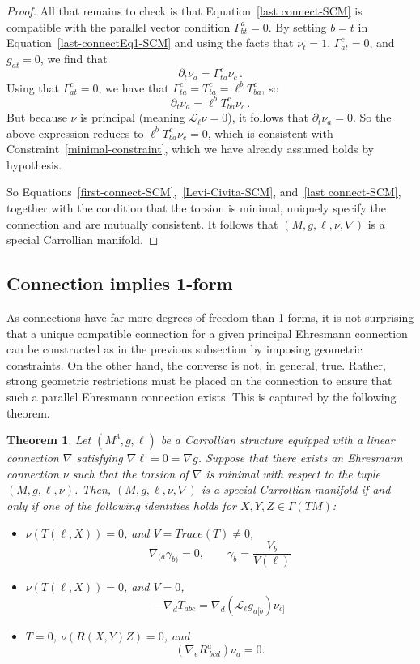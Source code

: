 \documentclass{article}
\newtheorem{theorem}{Theorem}[section]
\theoremstyle{definition}
\theoremstyle{remark}
\begin{document}
\begin{proof}
All that remains to check is that Equation~\ref{last connect-SCM} is compatible with the parallel vector condition $\Gamma^a_{bt} = 0$. By setting $b = t$ in Equation~\ref{last-connectEq1-SCM} and using the facts that $\nu_t = 1$, $\Gamma^c_{at} = 0$, and $g_{at} = 0$, we find that
$$\partial_t \nu_a = \Gamma^c_{ta} \nu_c\,.$$
Using that 
$\Gamma^c_{at} = 0$, we have that $\Gamma^c_{ta} = T^c_{ta} = \ell^b T^c_{ba}$, so
$$\partial_t \nu_a = \ell^b T^c_{ba} \nu_c\,.$$
But because $\nu$ is principal (meaning $\mathcal{L}_{\ell} \nu = 0$), it follows that $\partial_t \nu_a = 0$. So the above expression reduces to $\ell^b T^c_{ba} \nu_c = 0$, which is consistent with Constraint~\ref{minimal-constraint}, which we have already assumed holds by hypothesis.

So Equations~\ref{first-connect-SCM},~\ref{Levi-Civita-SCM}, and~\ref{last connect-SCM}, together with the condition that the torsion is minimal, uniquely specify the connection and are mutually consistent. It follows that $(M,g,\ell,\nu,\nabla)$ is a special Carrollian manifold.

\end{proof}

\subsection{Connection implies 1-form} \label{sec:SCM-con-1form}

As connections have far more degrees of freedom than 1-forms, it is not surprising that a unique compatible connection for a given principal Ehresmann connection can be constructed as in the previous subsection by imposing geometric constraints. On the other hand, the converse is not, in general, true. Rather, strong geometric restrictions must be placed on the connection to ensure that such a parallel Ehresmann connection exists. This is captured by the following theorem.

\begin{theorem}
\label{Thm:BMcharacterization}
    Let $(M^3,g,\ell)$ be a Carrollian structure equipped with a linear connection $\nabla$ satisfying $\nabla \ell = 0 = \nabla g$.
    Suppose that there exists an Ehresmann connection $\nu$ such that the torsion of $\nabla$ is minimal with respect to the tuple $(M,g,\ell,\nu)$. Then, $(M,g,\ell,\nu,\nabla)$ is a special Carrollian manifold if and only if one of the following identities holds for $X, Y, Z \in \Gamma(TM)$:
        \begin{itemize}
        \item $\nu(T(\ell, X)) = 0$, and $V = Trace(T) \neq 0$,
        $$\nabla_{(a}\gamma_{b)} = 0, \qquad \gamma_b = \frac{V_b}{V(\ell)} $$
        \item $\nu(T(\ell, X)) = 0$, and $V = 0$, 
        $$-\nabla_d T_{abc} = \nabla_d (\mathcal{L}_\ell g_{a[b}) \nu_{c]}  $$
        \item $T = 0$, $\nu(R(X,Y) Z ) = 0$, and 
        $$ (\nabla_e R^a_{~bcd}) \nu_a  = 0.$$
    \end{itemize}
\end{theorem}
\end{document}
